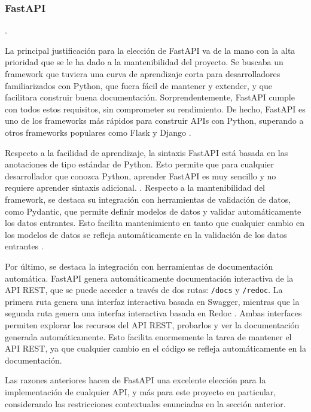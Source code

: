 \subsubsection{FastAPI}

 \cite{fastapi_docs}.

La principal justificación para la elección de FastAPI va de la mano con la alta prioridad que se le ha dado a la mantenibilidad del proyecto. Se buscaba un framework que tuviera una curva de aprendizaje corta para desarrolladores familiarizados con Python, que fuera fácil de mantener y extender, y que facilitara construir buena documentación. Sorprendentemente, FastAPI cumple con todos estos requisitos, sin comprometer su rendimiento. De hecho, FastAPI es uno de los frameworks más rápidos para construir APIs con Python, superando a otros frameworks populares como Flask y Django \cite{fastapi_benchmarks}.

Respecto a la facilidad de aprendizaje, la sintaxis FastAPI está basada en las anotaciones de tipo estándar de Python. Esto permite que para cualquier desarrollador que conozca Python, aprender FastAPI es muy sencillo y no requiere aprender sintaxis adicional. \cite{fastapi_features}. Respecto a la mantenibilidad del framework, se destaca su integración con herramientas de validación de datos, como \gls{Pydantic}, que permite definir modelos de datos y validar automáticamente los datos entrantes. Esto facilita mantenimiento en tanto que cualquier cambio en los modelos de datos se refleja automáticamente en la validación de los datos entrantes \cite{fastapi_features}.

Por último, se destaca la integración con herramientas de documentación automática. FastAPI genera automáticamente documentación interactiva de la API REST, que se puede acceder a través de dos rutas: \verb|/docs| y \verb|/redoc|. La primera ruta genera una interfaz interactiva basada en \gls{Swagger}, mientras que la segunda ruta genera una interfaz interactiva basada en \gls{Redoc} \cite{fastapi_features}. Ambas interfaces permiten explorar los recursos del API REST, probarlos y ver la documentación generada automáticamente. Esto facilita enormemente la tarea de mantener el API REST, ya que cualquier cambio en el código se refleja automáticamente en la documentación.

Las razones anteriores hacen de FastAPI una excelente elección para la implementación de cualquier API, y más para este proyecto en particular, considerando las restricciones contextuales enunciadas en la sección anterior.

